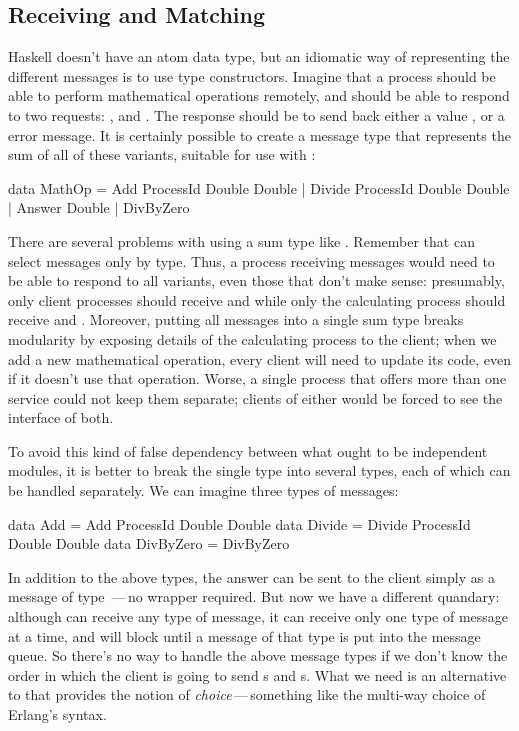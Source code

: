 \documentclass{sigplanconf}
\begin{document}
\subsection{Receiving and Matching}

Haskell doesn't have an atom data type, but an idiomatic way of representing the different messages is to use type constructors. Imagine that a process should be able to perform mathematical operations remotely, and should be able to respond to two requests: , and . 
The response should be to send back either a value , or a  error message.
It is certainly possible to create a message type that represents the sum of all of these variants, suitable for use with :

\begin{code}
data MathOp = Add ProcessId Double Double
            | Divide ProcessId Double Double
            | Answer Double
            | DivByZero
\end{code}

There are several problems with using a sum type like .
Remember that  can select messages only by type.
Thus, a process receiving  messages would need to be able to respond to all variants, even those that don't make sense: presumably, only client processes should receive  and  while only the calculating process should receive  and . 
Moreover, putting all messages into a single sum type breaks modularity by exposing details of the calculating process to the client; when we add a new mathematical operation, every client will need to update its code, even if it doesn't use that operation.
Worse, a single process that offers more than one service could not keep them separate; clients of either would be forced to see the interface of both.

To avoid this kind of false dependency between what ought to be independent modules, it is better to break the single  type into several types, each of which can be handled separately. 
We can imagine three types of messages:

\begin{code}
data Add = Add ProcessId Double Double
data Divide = Divide ProcessId Double Double
data DivByZero = DivByZero
\end{code}
\noindent
In addition to the above types, the answer can be sent to the client simply as a message of type \,---\,no wrapper required. 
But now we have a different quandary: although  can receive any type of message, it can receive only one type of message at a time, and will block until a message of that type is put into the message queue. 
So there's no way to handle the above message types if we don't know the order in which the client is going to send s and s. 
What we need is an alternative to  that provides the notion of {\em choice}\,---\,something like the multi-way choice of Erlang's  syntax.
 
\end{document}
